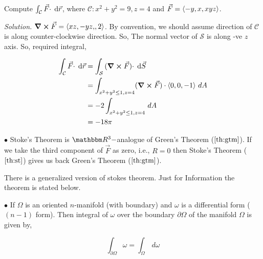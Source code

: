 \documentclass[../Analysis-3]{subfiles}
\begin{document}
\begin{Eg}{}{}
    Compute $\int_{\mathcal{C}} {\vec{F} \cdot } \hspace{0.1cm} \dd {\vec{r}}$, where $\mathcal{C} : x^2 +y^2 = 9, z =4$ and $\vec{F} = \left\langle {-y,x}, {xyz} \right\rangle$.

    \textit{Solution.} $\curl \vec{F} = \left\langle {xz,-yz,}, {2} \right\rangle$. By convention, we should assume direction of $\mathcal{C}$ is along counter-clockwise direction. So,  The normal vector of $\mathcal{S}$ is along -ve $z$ axis. So, required integral,

    \begin{align*}
        \int_{\mathcal{C}} {\vec{F} \cdot } \hspace{0.1cm} \dd {\vec{r}} & = \int_{\mathcal{S}} {(\curl \vec{F}) \cdot} \hspace{0.1cm} \dd {\vec{S}}                   \\
                                                    & = \int_{x^2+y^2 \le 1, z =4 } (\curl \vec{F}) \cdot \left\langle {0,0}, {-1} \right\rangle \,dA \\
                                                    & = -2 \int_{x^2+y^2 \le 1, z =4} \,dA                                   \\
                                                    & = -18\pi
    \end{align*}

\end{Eg}


$\bullet$ Stoke's Theorem is $\R^3-$analogue of Green's Theorem ($\ref{th:gtm}$). If we take the third component of $\vec{F}$ as zero, i.e., $R =0$ then Stoke's Theorem ($\ref{th:st}$) gives us back Green's Theorem ($\ref{th:gtm}$).

\begin{tcolorbox}
    There is a generalized version of stokes theorem. Just for Information the theorem is stated below.

    $\bullet$ If $\Omega$ is an oriented $n$-manifold (with boundary) and $\omega$ is a differential form ($(n-1)$ form). Then integral of $\omega$ over the boundary $\partial \Omega$ of the manifold $\Omega$ is given by,

    \[\int_{\partial \Omega} \omega = \int_{\Omega} \,d \omega\]

\end{tcolorbox}
\end{document}
